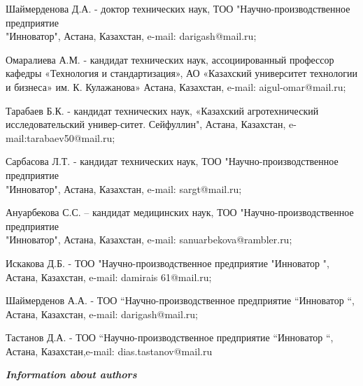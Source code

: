 \begin{noparindent}

Шаймерденова Д.А. - доктор технических наук, ТОО
"Научно-производственное предприятие \\"Инноватор", Астана, Казахстан,
e-mail: darigash@mail.ru;

Омаралиева А.М. - кандидат технических наук, ассоциированный профессор
кафедры «Технология и стандартизация», АО «Казахский университет
технологии и бизнеса» им. К. Кулажанова» Астана, Казахстан, e-mail:
aigul-omar@mail.ru;

Тарабаев Б.К. - кандидат технических наук, «Казахский агротехнический
исследовательский универ-ситет. Сейфуллин", Астана, Казахстан,
e-mail:tarabaev50@mail.ru;

Сарбасова Л.Т. - кандидат технических наук, ТОО "Научно-производственное
предприятие \\"Инноватор", Астана, Казахстан, e-mail: sargt@mail.ru;

Ануарбекова С.С. -- кандидат медицинских наук, ТОО
"Научно-производственное предприятие \\"Инноватор", Астана, Казахстан,
e-mail: sanuarbekova@rambler.ru;

Искакова Д.Б. - ТОО "Научно-производственное предприятие "Инноватор ",
Астана, Казахстан, e-mail: damirais 61@mail.ru;

Шаймерденов А.А. - ТОО ``Научно-производственное предприятие ``Инноватор
``, Астана, Казахстан, e-mail: darigash@mail.ru;

Тастанов Д.А. - ТОО ``Научно-производственное предприятие ``Инноватор
``, Астана, Казахстан,e-mail: dias.tastanov@mail.ru

\end{noparindent}

\emph{{\bfseries Information about authors}}

